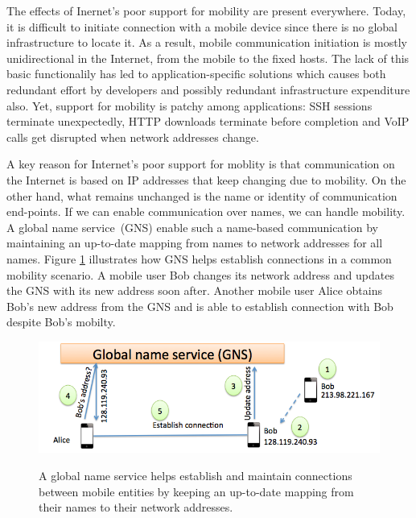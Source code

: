 The effects of Inernet's poor support for mobility are present everywhere. Today, it is difficult to initiate connection with a mobile device since there is no global infrastructure to locate it. As a result, mobile communication initiation is mostly unidirectional in the Internet, from the mobile to the fixed hosts. The lack of this basic functionalily has led to application-specific solutions which causes both redundant effort by developers and possibly redundant infrastructure expenditure also. Yet, support for mobility is patchy among applications: SSH sessions terminate unexpectedly, HTTP downloads terminate before completion and VoIP calls get disrupted when network addresses change.

A key reason for Internet's poor support for moblity is that communication on the Internet is based on IP addresses that keep changing due to mobility. On the other hand, what remains unchanged is the name or identity of communication end-points. If we can enable communication over names, we can handle mobility. A  global name service (GNS) enable such a name-based communication by maintaining an up-to-date mapping from names to network addresses for all names. Figure \ref{fig:gns-example} illustrates how GNS helps establish connections in a common mobility scenario. A mobile user Bob changes its network address and updates the GNS with its new address soon after. Another mobile user Alice obtains Bob's new address from the GNS and is able to establish connection with Bob despite Bob's mobilty.

\begin{figure}
	\centering
	\includegraphics[scale=0.4]{fig/gns-example.png}
	\label{fig:gns-example}
	\caption{A global name service helps establish and maintain connections between mobile entities by keeping an up-to-date mapping from their names to their network addresses.}
\end{figure}

